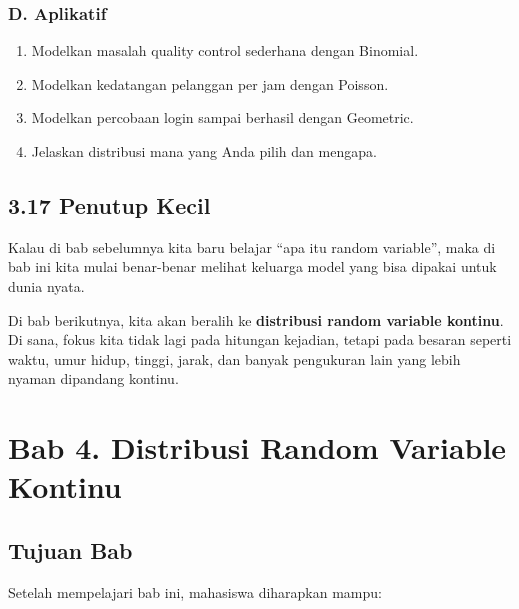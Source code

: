\documentclass[
  letterpaper,
  DIV=11,
  numbers=noendperiod]{scrreprt}
\providecommand{\tightlist}{%
  \setlength{\itemsep}{0pt}\setlength{\parskip}{0pt}}
\begin{document}
\subsection{D. Aplikatif}\label{d.-aplikatif-1}

\begin{enumerate}
\def\labelenumi{\arabic{enumi}.}
\tightlist
\item
  Modelkan masalah quality control sederhana dengan Binomial.
\item
  Modelkan kedatangan pelanggan per jam dengan Poisson.
\item
  Modelkan percobaan login sampai berhasil dengan Geometric.
\item
  Jelaskan distribusi mana yang Anda pilih dan mengapa.
\end{enumerate}

\section{3.17 Penutup Kecil}\label{penutup-kecil-2}

Kalau di bab sebelumnya kita baru belajar ``apa itu random variable'',
maka di bab ini kita mulai benar-benar melihat keluarga model yang bisa
dipakai untuk dunia nyata.

Di bab berikutnya, kita akan beralih ke \textbf{distribusi random
variable kontinu}. Di sana, fokus kita tidak lagi pada hitungan
kejadian, tetapi pada besaran seperti waktu, umur hidup, tinggi, jarak,
dan banyak pengukuran lain yang lebih nyaman dipandang kontinu.


\chapter{Bab 4. Distribusi Random Variable
Kontinu}\label{bab-4.-distribusi-random-variable-kontinu}

\section{Tujuan Bab}\label{tujuan-bab-3}

Setelah mempelajari bab ini, mahasiswa diharapkan mampu:
\end{document}
